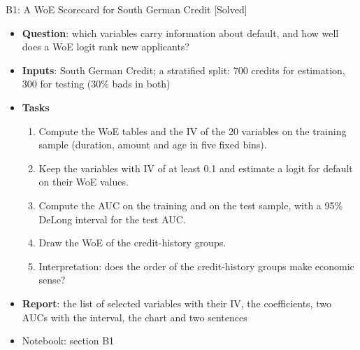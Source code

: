 \begin{frame}{B1: A WoE Scorecard for South German Credit [Solved]}
\itemsize{\footnotesize}
\begin{itemize}
\item \textbf{Question}: which variables carry information about default, and how well does a WoE logit rank new applicants?
\item \textbf{Inputs}: South German Credit; a stratified split: 700 credits for estimation, 300 for testing (30\% bads in both)
\item \textbf{Tasks}
\begin{enumerate}
    \item Compute the WoE tables and the IV of the 20 variables on the training sample (duration, amount and age in five fixed bins).
    \item Keep the variables with IV of at least 0.1 and estimate a logit for default on their WoE values.
    \item Compute the AUC on the training and on the test sample, with a 95\% DeLong interval for the test AUC.
    \item Draw the WoE of the credit-history groups.
    \item Interpretation: does the order of the credit-history groups make economic sense?
\end{enumerate}
\item \textbf{Report}: the list of selected variables with their IV, the coefficients, two AUCs with the interval, the chart and two sentences
\item Notebook: section B1
\end{itemize}
\end{frame}

